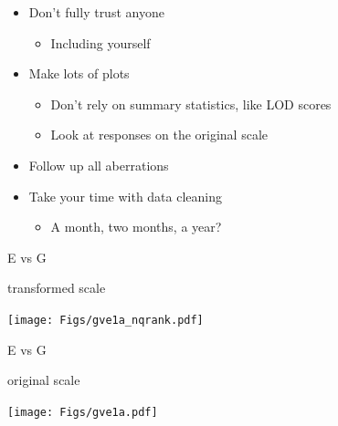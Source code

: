 \documentclass[12pt]{article}
\newcommand{\headsize}{\fontsize{35}{35} \selectfont}
\newcommand{\smallersize}{\fontsize{20}{25} \selectfont}
\newcommand{\smallestsize}{\fontsize{18}{22} \selectfont}
\begin{document}
\hfill \begin{minipage}{10in}

\begin{itemize}
\itemsep24pt

\item Don't fully trust anyone
{\smallestsize \color{myblue}
\begin{itemize}
\item Including yourself
\end{itemize} }

\item Make lots of plots
{\smallestsize \color{myblue}
\begin{itemize}
\item Don't rely on summary statistics, like LOD scores
\item Look at responses on the original scale
\end{itemize} }

\item Follow up all aberrations

\item Take your time with data cleaning
{\smallestsize \color{myblue}
\begin{itemize}
\item A month, two months, a year?
\end{itemize} }




\end{itemize}
\end{minipage}


\newpage

\headsize \color{myyellow}
\hfill \begin{minipage}{5.75in}
\centering
E vs G

{\smallersize \color{mywhite} transformed scale}
\end{minipage}

\vfill

\centerline{\texttt{[image: Figs/gve1a\_nqrank.pdf]}}

\newpage

\headsize \color{myyellow}
\hfill \begin{minipage}{5.75in}
\centering
E vs G

{\smallersize \color{mywhite} original scale}
\end{minipage}

\vfill

\centerline{\texttt{[image: Figs/gve1a.pdf]}}

\newpage
\end{document}
